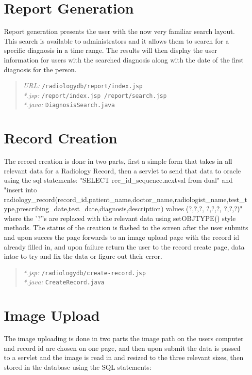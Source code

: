 \documentclass[11pt]{report}
\begin{document}
\section*{Report Generation}
Report generation presents the user with the now very familiar search layout. This search is available to administrators and it allows them to search for a specific diagnosis in a time range. The results will then display the user information for users with the searched diagnosis along with the date of the first diagnosis for the person.

\begin{quote}
\emph{URL:} \texttt{/radiologydb/report/index.jsp} \\
\emph{*.jsp: } \texttt{/report/index.jsp /report/search.jsp} \\
\emph{*.java: } \texttt{DiagnosisSearch.java}
\end{quote}

\section*{Record Creation}
The record creation is done in two parts, first a simple form that takes in all relevant data for a Radiology Record, then a servlet to send that data to oracle using the sql statements: "SELECT rec_id_sequence.nextval from dual" and  "insert into radiology_record(record_id,patient_name,doctor_name,radiologist_name,test_type,prescribing_date,test_date,diagnosis,description) values (?,?,?, ?,?,?, ?,?,?)" where the '?''s are replaced with the relevant data using setOBJTYPE() style methods.
The status of the creation is flashed to the screen after the user submits and upon succes the page forwards to an image upload page with the record id already filled in, and upon failure return the user to the record create page, data intac to try and fix the data or figure out their error.  

\begin{quote}
\emph{*.jsp:} \texttt{/radiologydb/create-record.jsp} \\
\emph{*.java: } \texttt{CreateRecord.java}
\end{quote}



\section*{Image Upload}
The image uploading is done in two parts the image path on the users computer and record id are chosen on one page, and then upon submit the data is passed to a servlet and the image is read in and resized to the three relevant sizes, then stored in the database using the SQL statements:
\end{document}
